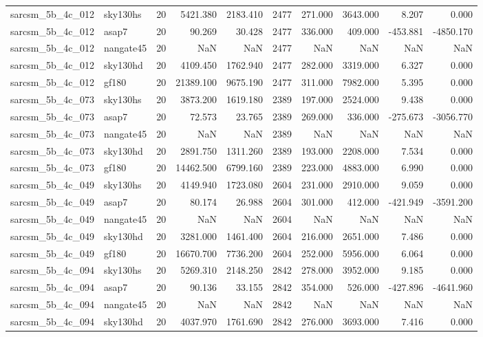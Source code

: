 \documentclass{article}
\begin{document}
\begin{longtable}{llrrrrrrrr}
sarcsm\_5b\_4c\_012 & sky130hs & 20 & 5421.380 & 2183.410 & 2477 & 271.000 & 3643.000 & 8.207 & 0.000 \\
sarcsm\_5b\_4c\_012 & asap7 & 20 & 90.269 & 30.428 & 2477 & 336.000 & 409.000 & -453.881 & -4850.170 \\
sarcsm\_5b\_4c\_012 & nangate45 & 20 & NaN & NaN & 2477 & NaN & NaN & NaN & NaN \\
sarcsm\_5b\_4c\_012 & sky130hd & 20 & 4109.450 & 1762.940 & 2477 & 282.000 & 3319.000 & 6.327 & 0.000 \\
sarcsm\_5b\_4c\_012 & gf180 & 20 & 21389.100 & 9675.190 & 2477 & 311.000 & 7982.000 & 5.395 & 0.000 \\
sarcsm\_5b\_4c\_073 & sky130hs & 20 & 3873.200 & 1619.180 & 2389 & 197.000 & 2524.000 & 9.438 & 0.000 \\
sarcsm\_5b\_4c\_073 & asap7 & 20 & 72.573 & 23.765 & 2389 & 269.000 & 336.000 & -275.673 & -3056.770 \\
sarcsm\_5b\_4c\_073 & nangate45 & 20 & NaN & NaN & 2389 & NaN & NaN & NaN & NaN \\
sarcsm\_5b\_4c\_073 & sky130hd & 20 & 2891.750 & 1311.260 & 2389 & 193.000 & 2208.000 & 7.534 & 0.000 \\
sarcsm\_5b\_4c\_073 & gf180 & 20 & 14462.500 & 6799.160 & 2389 & 223.000 & 4883.000 & 6.990 & 0.000 \\
sarcsm\_5b\_4c\_049 & sky130hs & 20 & 4149.940 & 1723.080 & 2604 & 231.000 & 2910.000 & 9.059 & 0.000 \\
sarcsm\_5b\_4c\_049 & asap7 & 20 & 80.174 & 26.988 & 2604 & 301.000 & 412.000 & -421.949 & -3591.200 \\
sarcsm\_5b\_4c\_049 & nangate45 & 20 & NaN & NaN & 2604 & NaN & NaN & NaN & NaN \\
sarcsm\_5b\_4c\_049 & sky130hd & 20 & 3281.000 & 1461.400 & 2604 & 216.000 & 2651.000 & 7.486 & 0.000 \\
sarcsm\_5b\_4c\_049 & gf180 & 20 & 16670.700 & 7736.200 & 2604 & 252.000 & 5956.000 & 6.064 & 0.000 \\
sarcsm\_5b\_4c\_094 & sky130hs & 20 & 5269.310 & 2148.250 & 2842 & 278.000 & 3952.000 & 9.185 & 0.000 \\
sarcsm\_5b\_4c\_094 & asap7 & 20 & 90.136 & 33.155 & 2842 & 354.000 & 526.000 & -427.896 & -4641.960 \\
sarcsm\_5b\_4c\_094 & nangate45 & 20 & NaN & NaN & 2842 & NaN & NaN & NaN & NaN \\
sarcsm\_5b\_4c\_094 & sky130hd & 20 & 4037.970 & 1761.690 & 2842 & 276.000 & 3693.000 & 7.416 & 0.000 \\

\end{longtable}
\end{document}

